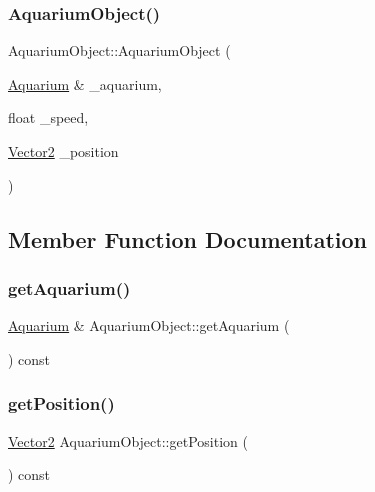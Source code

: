 \subsubsection{\texorpdfstring{Aquarium\+Object()}{AquariumObject()}}
{\footnotesize\ttfamily Aquarium\+Object\+::\+Aquarium\+Object (\begin{DoxyParamCaption}\item[{\mbox{\hyperlink{class_aquarium}{Aquarium}} \&}]{\+\_\+aquarium,  }\item[{float}]{\+\_\+speed,  }\item[{\mbox{\hyperlink{struct_vector2}{Vector2}}}]{\+\_\+position }\end{DoxyParamCaption})}



\subsection{Member Function Documentation}
\mbox{\label{class_aquarium_object_a229f2c41d3aa352bcbd7b994dd540f97}} 
\subsubsection{\texorpdfstring{get\+Aquarium()}{getAquarium()}}
{\footnotesize\ttfamily \mbox{\hyperlink{class_aquarium}{Aquarium}} \& Aquarium\+Object\+::get\+Aquarium (\begin{DoxyParamCaption}{ }\end{DoxyParamCaption}) const}

\mbox{\label{class_aquarium_object_aed4986687e54beb0ce780a9cafbda990}} 
\subsubsection{\texorpdfstring{get\+Position()}{getPosition()}}
{\footnotesize\ttfamily \mbox{\hyperlink{struct_vector2}{Vector2}} Aquarium\+Object\+::get\+Position (\begin{DoxyParamCaption}{ }\end{DoxyParamCaption}) const}

\mbox{\label{class_aquarium_object_a0e554167f04a77e452d5714d31fadada}} 
